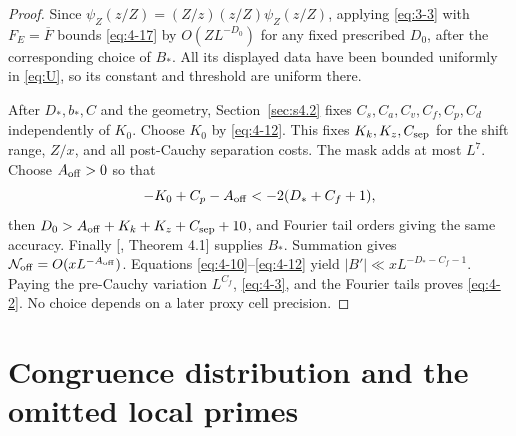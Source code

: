 \documentclass[11pt]{article}
\theoremstyle{definition}
\theoremstyle{definition}
\begin{document}
\begin{proof}
Since \(\psi_Z(z/Z)=(Z/z)(z/Z)\psi_Z(z/Z)\), applying \eqref{eq:3-3} with \(F_E=\overline F\) bounds \eqref{eq:4-17} by \(O(ZL^{-D_0})\) for any fixed prescribed \(D_0\), after the corresponding choice of \(B_*\). All its displayed data have been bounded uniformly in \eqref{eq:U}, so its constant and threshold are uniform there.

After \(D_*,b_*,C\) and the geometry, Section~\ref{sec:s4.2} fixes \(C_s,C_a,C_v,C_f,C_p,C_d\) independently of \(K_0\). Choose \(K_0\) by \eqref{eq:4-12}. This fixes \(K_k,K_z,C_{\rm sep}\) for the shift range, \(Z/x\), and all post-Cauchy separation costs. The mask adds at most \(L^7\). Choose \(A_{\rm off}>0\) so that
\begin{equation*}
-K_0+C_p-A_{\rm off}<-2(D_*+C_f+1),
\end{equation*}
then \(D_0>A_{\rm off}+K_k+K_z+C_{\rm sep}+10\), and Fourier tail orders giving the same accuracy. Finally [, Theorem 4.1] supplies \(B_*\). Summation gives \(\mathcal N_{\rm off}=O(xL^{-A_{\rm off}})\). Equations \eqref{eq:4-10}--\eqref{eq:4-12} yield \(|B'|\ll xL^{-D_*-C_f-1}\). Paying the pre-Cauchy variation \(L^{C_f}\), \eqref{eq:4-3}, and the Fourier tails proves \eqref{eq:4-2}. No choice depends on a later proxy cell precision. 



\end{proof}

\section{Congruence distribution and the omitted local primes}\label{sec:s5}
\end{document}
